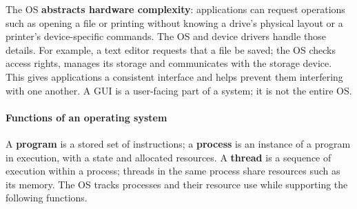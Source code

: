 \documentclass[a4paper,12pt]{article}
\begin{document}
The OS \textbf{abstracts hardware complexity}: applications can request operations such as opening a file or printing without knowing a drive's physical layout or a printer's device-specific commands. The OS and device drivers handle those details. For example, a text editor requests that a file be saved; the OS checks access rights, manages its storage and communicates with the storage device. This gives applications a consistent interface and helps prevent them interfering with one another. A GUI is a user-facing part of a system; it is not the entire OS.

\paragraph{Functions of an operating system}
A \textbf{program} is a stored set of instructions; a \textbf{process} is an instance of a program in execution, with a state and allocated resources. A \textbf{thread} is a sequence of execution within a process; threads in the same process share resources such as its memory. The OS tracks processes and their resource use while supporting the following functions.
\end{document}

